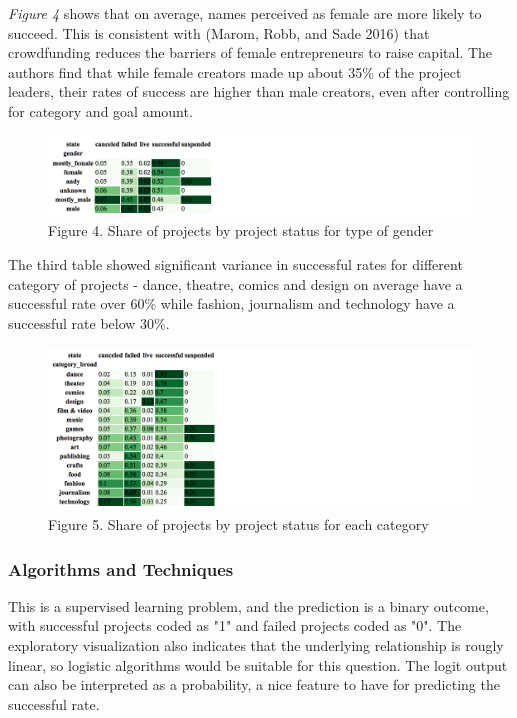 \documentclass[11pt]{article}
\makeatletter
\def\maxwidth{\ifdim\Gin@nat@width>\linewidth\linewidth
    \else\Gin@nat@width\fi}
\let\Oldincludegraphics\includegraphics
\renewcommand{\includegraphics}[1]{\Oldincludegraphics[width=.8\maxwidth]{#1}}
\makeatother
\begin{document}
\emph{Figure 4} shows that on average, names perceived as female are
more likely to succeed. This is consistent with (Marom, Robb, and Sade
2016) that crowdfunding reduces the barriers of female entrepreneurs to
raise capital. The authors find that while female creators made up about
35\% of the project leaders, their rates of success are higher than male
creators, even after controlling for category and goal amount.

\begin{figure}
\centering
\includegraphics{plots/gender_table.png}
\caption{Figure 4. Share of projects by project status for type of
gender}
\end{figure}

The third table showed significant variance in successful rates for
different category of projects - dance, theatre, comics and design on
average have a successful rate over 60\% while fashion, journalism and
technology have a successful rate below 30\%.

\begin{figure}
\centering
\includegraphics{plots/cat_table.png}
\caption{Figure 5. Share of projects by project status for each
category}
\end{figure}

\subsubsection{Algorithms and
Techniques}\label{algorithms-and-techniques}

This is a supervised learning problem, and the prediction is a binary
outcome, with successful projects coded as "1" and failed projects coded
as "0". The exploratory visualization also indicates that the underlying
relationship is rougly linear, so logistic algorithms would be suitable
for this question. The logit output can also be interpreted as a
probability, a nice feature to have for predicting the successful rate.
\end{document}
